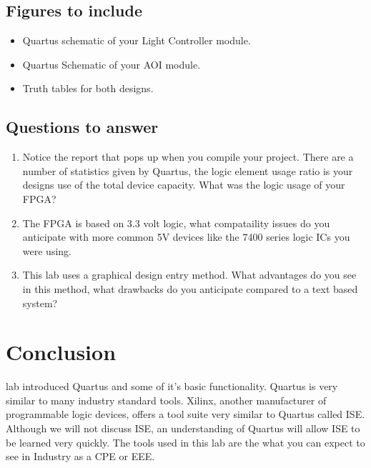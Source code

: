     \subsection{Figures to include}
    \begin{itemize}
      \item Quartus schematic of your Light Controller module.
      \item Quartus Schematic of your AOI module.
      \item Truth tables for both designs.
    \end{itemize}

    \subsection{Questions to answer}
    \begin{enumerate}
      \item Notice the report that pops up when you compile your project. There are a number of statistics given by Quartus, the logic element usage ratio is your designs use of the total device capacity. What was the logic usage of your FPGA?
      \item The FPGA is based on 3.3 volt logic, what compataility issues do you anticipate with more common 5V devices like the 7400 series logic ICs you were using.
      \item This lab uses a graphical design entry method. What advantages do you see in this method, what drawbacks do you anticipate compared to a text based system?
    \end{enumerate}

  \section{Conclusion}
     lab introduced Quartus and some of it's basic functionality. Quartus is very similar to many industry standard tools. Xilinx, another manufacturer of programmable logic devices, offers a tool suite very similar to Quartus called ISE. Although we will not discuss ISE, an understanding of Quartus will allow ISE to be learned very quickly. The tools used in this lab are the what you can expect to see in Industry as a CPE or EEE.

  

